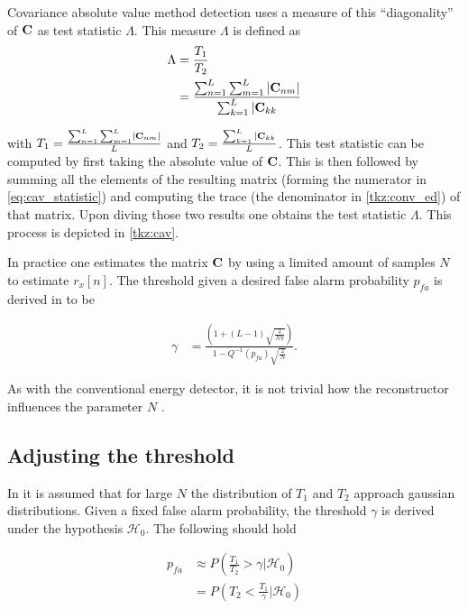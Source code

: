 \documentclass[a4paper, openany, oneside]{memoir}
\begin{document}
Covariance absolute value method detection uses a measure of this ``diagonality'' of $\boldsymbol{\mathbf{C}}$ as test statistic $\Lambda$.
This measure $\Lambda$ is defined as
\begin{align}\label{eq:cav_statistic}
\Lambda &= \frac{T_1}{T_2} \nonumber \\
&=\frac{\sum_{n=1}^{L} \sum_{m=1}^L \left|\boldsymbol{\mathbf{C}}_{nm}\right|}{\sum_{k=1}^L |\boldsymbol{\mathbf{C}}_{kk}}
\end{align} 

with $T_1 = \frac{\sum_{n=1}^{L} \sum_{m=1}^L \left|\boldsymbol{\mathbf{C}}_{nm}\right|}{L}$ and
$T_2 = \frac{\sum_{k=1}^L |\boldsymbol{\mathbf{C}}_{kk}}{L}$.
This test statistic can be computed by first taking the absolute value of $\boldsymbol{\mathbf{C}}$. This is then followed by summing all the elements of the resulting matrix (forming the numerator in \cref{eq:cav_statistic}) and computing the trace (the denominator in \cref{tkz:conv_ed}) of that matrix. Upon diving those two results one obtains the test statistic $\Lambda$. This process is depicted in \cref{tkz:cav}.

In practice one estimates the matrix $\boldsymbol{\mathbf{C}}$ by using a limited amount of samples $N$ to estimate $r_x[n]$. The threshold given a desired false alarm probability
$p_{fa}$ is derived in \cite{zheng2009spectrum} to be

\begin{align*}
\gamma &= \frac{\left(1+(L-1)\sqrt{\frac{2}{N\pi}}\right)}{1-Q^{-1}(p_{fa})\sqrt{\frac{2}{N}}}.
\end{align*} 

As with the conventional energy detector, it is not trivial how the reconstructor influences the parameter $N$ .

\subsection{Adjusting the threshold}

In \cite{zheng2009spectrum} it is assumed that for large $N$ the distribution of $T_1$ and $T_2$ approach gaussian distributions. Given a fixed false alarm probability, the threshold $\gamma$ is derived under the hypothesis $\mathcal{H}_0$. The following should hold

\begin{align*}
p_{fa} &\approx P\left(\frac{T_1}{T_2} > \gamma \big | \mathcal{H}_0\right) \\
&= P\left(T_2 < \frac{T_1}{\gamma} \big | \mathcal{H}_0\right)
\end{align*}
\end{document}
